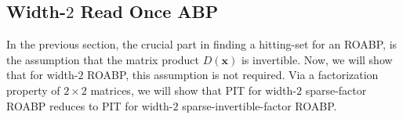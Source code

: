 \documentclass[final,oneeqnum, onethmnum, onefignum]{siamltex1213}
\newcommand{\F}{\mathbb F}
\newcommand{\Dx}{D(\mathbf{x})}
\begin{document}
\subsection{Width-$2$ Read Once ABP}
\label{sec:2ROABP}
In the previous section, the crucial part in finding a hitting-set for an ROABP,
is the assumption that the matrix product $\Dx$ is invertible. 
Now, we will show that for width-$2$ ROABP, this assumption is not required.
Via a factorization property of $2 \times 2$ matrices,
 we will show that PIT for width-$2$ sparse-factor ROABP
reduces to PIT for width-$2$ sparse-invertible-factor ROABP. 
\end{document}
